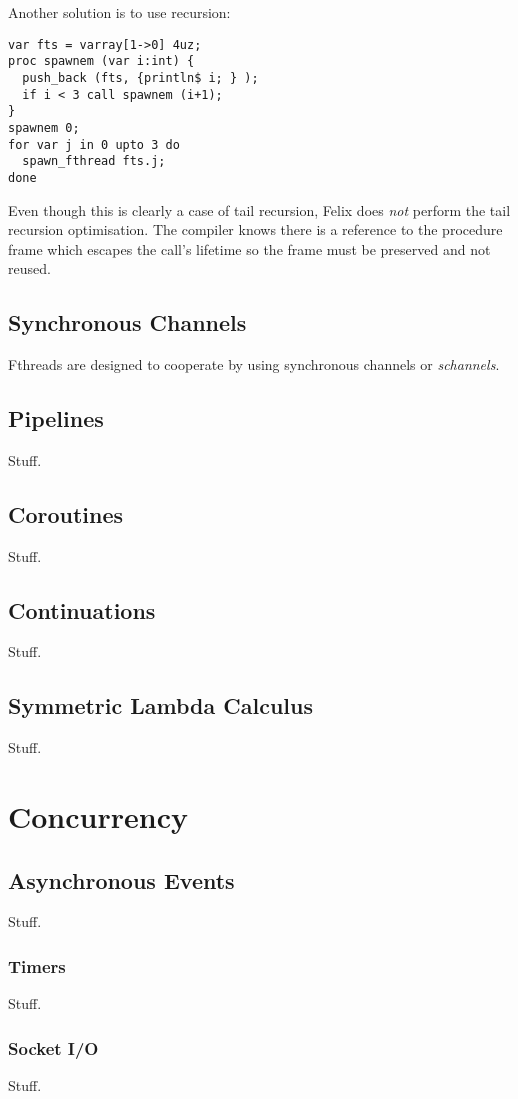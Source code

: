 \documentclass[oneside]{book}
\begin{document}
Another solution is to use recursion:

\begin{verbatim}
var fts = varray[1->0] 4uz;
proc spawnem (var i:int) {
  push_back (fts, {println$ i; } );
  if i < 3 call spawnem (i+1);
}
spawnem 0;
for var j in 0 upto 3 do
  spawn_fthread fts.j;
done
\end{verbatim}

Even though this is clearly a case of tail recursion, Felix does
{\em not} perform the tail recursion optimisation. The compiler
knows there is a reference to the procedure frame which escapes
the call's lifetime so the frame must be preserved and not reused.

\chapter{Synchronous Channels}
Fthreads are designed to cooperate by using synchronous channels or {\em schannels}.

\chapter{Pipelines}
Stuff.
\chapter{Coroutines}
Stuff.
\chapter{Continuations}
Stuff.
\chapter{Symmetric Lambda Calculus}
Stuff.

\part{Concurrency}
\chapter{Asynchronous Events}
Stuff.
\section{Timers}
Stuff.
\section{Socket I/O}
Stuff.
\end{document}

